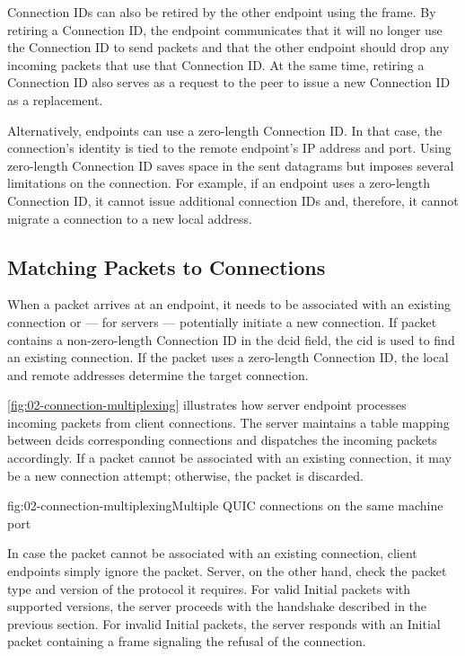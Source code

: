 Connection IDs can also be retired by the other endpoint using the \RETIRECONNECTIONID{} frame. By
retiring a Connection ID, the endpoint communicates that it will no longer use the Connection ID to
send packets and that the other endpoint should drop any incoming packets that use that Connection
ID. At the same time, retiring a Connection ID also serves as a request to the peer to issue a new
Connection ID as a replacement.

Alternatively, endpoints can use a zero-length Connection ID. In that case, the connection's
identity is tied to the remote endpoint's IP address and port. Using zero-length Connection ID saves
space in the sent datagrams but imposes several limitations on the connection. For example, if an
endpoint uses a zero-length Connection ID, it cannot issue additional connection IDs and, therefore,
it cannot migrate a connection to a new local address.

\subsection{Matching Packets to Connections}

When a packet arrives at an endpoint, it needs to be associated with an existing connection or ---
for servers --- potentially initiate a new connection. If packet contains a non-zero-length
Connection ID in the \gls{dcid} field, the \gls{cid} is used to find an existing connection. If the
packet uses a zero-length Connection ID, the local and remote addresses determine the target
connection.

\autoref{fig:02-connection-multiplexing} illustrates how server endpoint processes incoming packets
from client connections. The server maintains a table mapping between \gls{dcid}s corresponding
connections and dispatches the incoming packets accordingly. If a packet cannot be associated with
an existing connection, it may be a new connection attempt; otherwise, the packet is discarded.

\begin{myFigure}{fig:02-connection-multiplexing}{Multiple QUIC connections on the same machine port}



\end{myFigure}

In case the packet cannot be associated with an existing connection, client endpoints simply ignore
the packet. Server, on the other hand, check the packet type and version of the protocol it
requires. For valid Initial packets with supported versions, the server proceeds with the handshake
described in the previous section. For invalid Initial packets, the server responds with an Initial
packet containing a \CONNECTIONCLOSE{} frame signaling the refusal of the connection.

